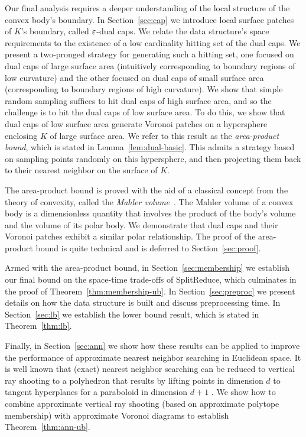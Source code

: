 \documentclass[11pt]{article}   \usepackage[letterpaper,hmargin=2.1cm,vmargin=3cm]{geometry}
\newcommand{\alg}{\textrm{SplitReduce}}
\begin{document}
Our final analysis requires a deeper understanding of the local structure of the convex body's boundary. In Section~\ref{sec:cap} we introduce local surface patches of $K$'s boundary, called $\varepsilon$-dual caps. We relate the data structure's space requirements to the existence of a low cardinality hitting set of the dual caps. We present a two-pronged strategy for generating such a hitting set, one focused on dual caps of large surface area (intuitively corresponding to boundary regions of low curvature) and the other focused on dual caps of small surface area (corresponding to boundary regions of high curvature). We show that simple random sampling suffices to hit dual caps of high surface area, and so the challenge is to hit the dual caps of low surface area. To do this, we show that dual caps of low surface area generate Voronoi patches on a hypersphere enclosing $K$ of large surface area. We refer to this result as the \emph{area-product bound}, which is stated in Lemma~\ref{lem:dual-basic}. This admits a strategy based on sampling points randomly on this hypersphere, and then projecting them back to their nearest neighbor on the surface of $K$. 

The area-product bound is proved with the aid of a classical concept from the theory of convexity, called the \emph{Mahler volume}~\cite{BoMi,Santalo}. The Mahler volume of a convex body is a dimensionless quantity that involves the product of the body's volume and the volume of its polar body. We demonstrate that dual caps and their Voronoi patches exhibit a similar polar relationship. The proof of the area-product bound is quite technical and is deferred to Section~\ref{sec:proof}. 

Armed with the area-product bound, in Section~\ref{sec:membership} we establish our final bound on the space-time trade-offs of {\alg}, which culminates in the proof of Theorem~\ref{thm:membership-ub}. In Section~\ref{sec:preproc} we present details on how the data structure is built and discuss preprocessing time. In Section~\ref{sec:lb} we establish the lower bound result, which is stated in Theorem~\ref{thm:lb}. 

Finally, in Section~\ref{sec:ann} we show how these results can be applied to improve the performance of approximate nearest neighbor searching in Euclidean space. It is well known that (exact) nearest neighbor searching can be reduced to vertical ray shooting to a polyhedron that results by lifting points in dimension $d$ to tangent hyperplanes for a paraboloid in dimension $d+1$ \cite{ray-shooting-NN,edels}. We show how to combine approximate vertical ray shooting (based on approximate polytope membership) with approximate Voronoi diagrams to establish Theorem~\ref{thm:ann-ub}.
\end{document}
